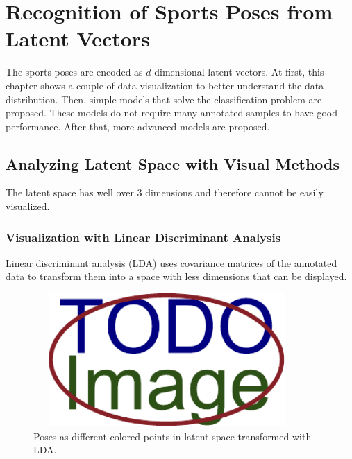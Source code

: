 \chapter{\label{chap:recognizing}Recognition of Sports Poses from Latent Vectors}

The sports poses are encoded as $d$-dimensional latent vectors. At first, this chapter shows a couple of data visualization to better understand the data distribution. Then, simple models that solve the classification problem are proposed. These models do not require many annotated samples to have good performance. After that, more advanced models are proposed.

\blindtext

\section{Analyzing Latent Space with Visual Methods}

The latent space has well over 3 dimensions and therefore cannot be easily visualized.
\blindtext

\blindtext

\blindtext

\subsection{Visualization with Linear Discriminant Analysis}

Linear discriminant analysis (LDA) uses covariance matrices of the annotated data to transform them into a space with less dimensions that can be displayed.
\blindtext

\blindtext

\blindtext

\begin{figure}[ht]\centering
  \centering
  \includegraphics[width=4in,height=2in]{figures/placeholder.pdf}
  \caption{Poses as different colored points in latent space transformed with LDA.}
  \label{LDA}
\end{figure}

